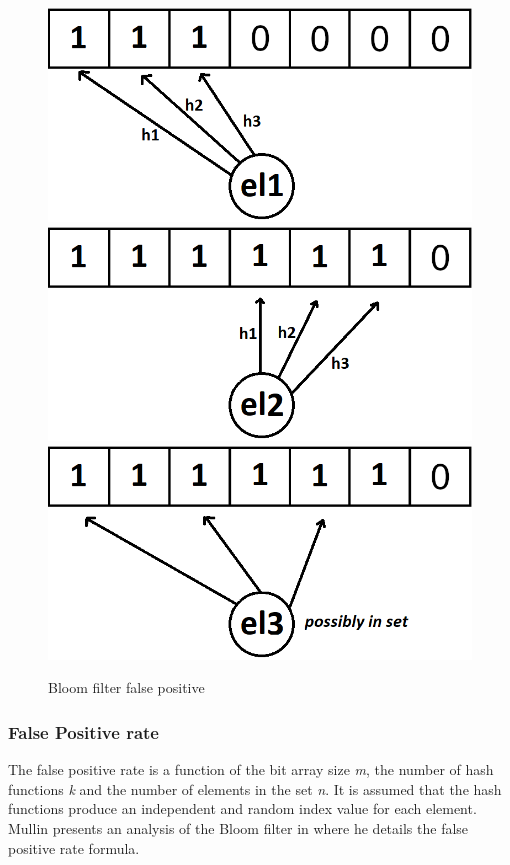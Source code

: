 \begin{figure}[!htb]
    \begin{center}
      \includegraphics[scale=0.4]{figures/fp-bloom-1.png}
      \includegraphics[scale=0.4]{figures/fp-bloom-2.png}
      \includegraphics[scale=0.4]{figures/fp-bloom-3.png}
      \caption{Bloom filter false positive}
      \label{fig:bloom-filter-fp}
    \end{center}
\end{figure}


\subsubsection*{False Positive rate}
The false positive rate is a function of the bit array size \textit{m}, the number of hash functions \textit{k} and the number of elements in the set \textit{n}. It is assumed that the hash functions produce an independent and random index value for each element. Mullin presents an analysis of the Bloom filter in \cite{Mullin-Bloom-Analysis} where he details the false positive rate formula. 

